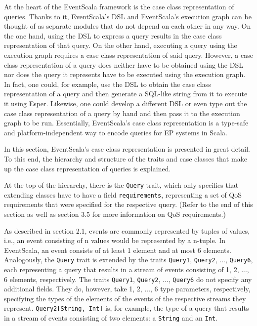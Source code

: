 \documentclass[article, type=bsc, colorback, accentcolor=tud8b, parskip=half, bibliography=totocnumbered]{tudthesis}
\begin{document}
At the heart of the EventScala framework is the case class representation of queries.
Thanks to it, EventScala's DSL and EventScala's execution graph can be thought of as separate modules that do not depend on each other in any way.
On the one hand, using the DSL to express a query results in the case class representation of that query.
On the other hand, executing a query using the execution graph requires a case class representation of said query.
However, a case class representation of a query does neither have to be obtained using the DSL nor does the query it represents have to be executed using the execution graph.
In fact, one could, for example, use the DSL to obtain the case class representation of a query and then generate a SQL-like string from it to execute it using Esper.
Likewise, one could develop a different DSL or even type out the case class representation of a query by hand and then pass it to the execution graph to be run.
Essentially, EventScala's case class representation is a type-safe and platform-independent way to encode queries for EP systems in Scala.

In this section, EventScala's case class representation is presented in great detail.
To this end, the hierarchy and structure of the traits and case classes that make up the case class representation of queries is explained.

At the top of the hierarchy, there is the \lstinline{Query} trait, which only specifies that extending classes have to have a field \lstinline{requirements}, representing a set of QoS requirements that were specified for the respective query.
(Refer to the end of this section as well as section 3.5 for more information on QoS requirements.)

As described in section 2.1, events are commonly represented by tuples of values, i.e., an event consisting of n values would be represented by a n-tuple.
In EventScala, an event consists of at least 1 element and at most 6 elements.
Analogously, the \lstinline{Query} trait is extended by the traits \lstinline{Query1}, \lstinline{Query2}, ..., \lstinline{Query6}, each representing a query that results in a stream of events consisting of 1, 2, ..., 6 elements, respectively.
The traits \lstinline{Query1}, \lstinline{Query2}, ..., \lstinline{Query6} do not specify any additional fields.
They do, however, take 1, 2, ..., 6 type parameters, respectively, specifying the types of the elements of the events of the respective streams they represent.
\lstinline{Query2[String, Int]} is, for example, the type of a query that results in a stream of events consisting of two elements: a \lstinline{String} and an \lstinline{Int}.
\end{document}
